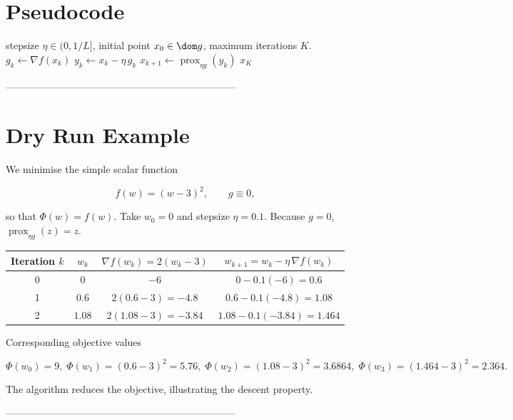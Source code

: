 \documentclass{article}
\newcommand{\prox}{\operatorname{prox}}
\newcommand{\grad}{\nabla}
\begin{document}
\section*{Pseudocode}
\begin{algorithm}[H]
\caption{Proximal Gradient for Non‑Convex Composite $\Phi=f+g$}
\begin{algorithmic}[1]
\Require stepsize $\eta\in(0,1/L]$, initial point $x_{0}\in\dom g$, maximum iterations $K$.
    \State $g_{k}\gets \grad f(x_{k})$ 
    \State $y_{k}\gets x_{k}-\eta\,g_{k}$ 
    \State $x_{k+1}\gets \prox_{\eta g}(y_{k})$ 
\EndFor
\State \Return $x_{K}$
\end{algorithmic}
\end{algorithm}

---------------------------------------------------------------------

\section*{Dry Run Example}
We minimise the simple scalar function  

\[
f(w)=(w-3)^{2},\qquad g\equiv 0,
\]

so that $\Phi(w)=f(w)$.  
Take $w_{0}=0$ and stepsize $\eta=0.1$.  
Because $g=0$, $\prox_{\eta g}(z)=z$.

\begin{center}
\begin{tabular}{c|c|c|c}
Iteration $k$ & $w_{k}$ & $\grad f(w_{k})=2(w_{k}-3)$ & $w_{k+1}=w_{k}-\eta\,\grad f(w_{k})$\\\hline
0 & $0$ & $-6$ & $0-0.1(-6)=0.6$ \\
1 & $0.6$ & $2(0.6-3)=-4.8$ & $0.6-0.1(-4.8)=1.08$ \\
2 & $1.08$ & $2(1.08-3)=-3.84$ & $1.08-0.1(-3.84)=1.464$ 
\end{tabular}
\end{center}

Corresponding objective values  

\[
\Phi(w_{0})=9,\;\Phi(w_{1})=(0.6-3)^{2}=5.76,\;\Phi(w_{2})=(1.08-3)^{2}=3.6864,\;\Phi(w_{3})=(1.464-3)^{2}=2.364.
\]

The algorithm reduces the objective, illustrating the descent property.

---------------------------------------------------------------------
\end{document}
